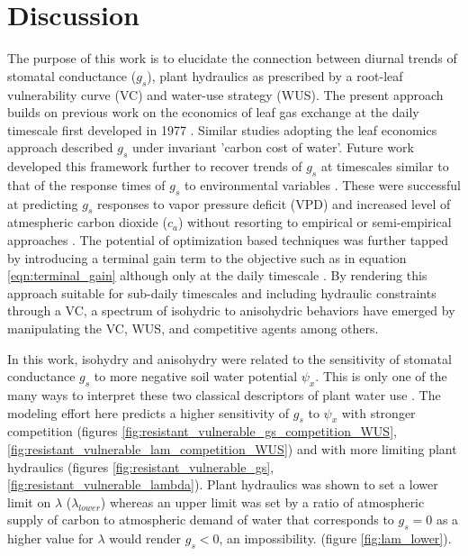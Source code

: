 \documentclass[utf8]{frontiersSCNS} %
\begin{document}
\section{Discussion}

The purpose of this work is to elucidate the connection between diurnal trends of stomatal conductance ($g_s$), plant hydraulics as prescribed by a root-leaf vulnerability curve (VC) and water-use strategy (WUS). The present approach builds on previous work on the economics of leaf gas exchange at the daily timescale first developed in 1977 \citep{cowan1977, cowan1978stomatal}. Similar studies adopting the leaf economics approach described $g_s$ under invariant 'carbon cost of water'. Future work developed this framework further to recover trends of $g_s$ at timescales similar to that of the response times of $g_s$ to environmental variables \citep{Katul2009, Katul2009a}. These were successful at predicting $g_s$ responses to vapor pressure deficit (VPD) and increased level of atmespheric carbon dioxide ($c_a$) without resorting to empirical or semi-empirical approaches \citep{jarvis1976interpretation, collatz1991physiological, leuning1995critical}. The potential of optimization based techniques was further tapped by introducing a terminal gain term to the objective such as in  equation \ref{eqn:terminal_gain} although only at the daily timescale \citep{Manzoni2013}. By rendering this approach suitable for sub-daily timescales and including hydraulic constraints through a VC, a spectrum of isohydric to anisohydric behaviors have emerged by manipulating the VC, WUS, and competitive agents among others.

In this work, isohydry and anisohydry were related to the sensitivity of stomatal conductance $g_s$ to more negative soil water potential $\psi_x$. This is only one of the many ways to interpret these two classical descriptors of plant water use \citep{Hochberg2017}. The modeling effort here predicts a higher sensitivity of $g_s$ to $\psi_x$ with stronger competition (figures \ref{fig:resistant_vulnerable_gs_competition_WUS}, \ref{fig:resistant_vulnerable_lam_competition_WUS}) and with more limiting plant hydraulics (figures \ref{fig:resistant_vulnerable_gs}, \ref{fig:resistant_vulnerable_lambda}). Plant hydraulics was shown to set a lower limit on $\lambda$ ($\lambda_{lower}$) whereas an upper limit was set by a ratio of atmospheric supply of carbon to atmospheric demand of water that corresponds to $g_s=0$ as a higher value for $\lambda$ would render $g_s<0$, an impossibility. (figure \ref{fig:lam_lower}).
 
\end{document}
